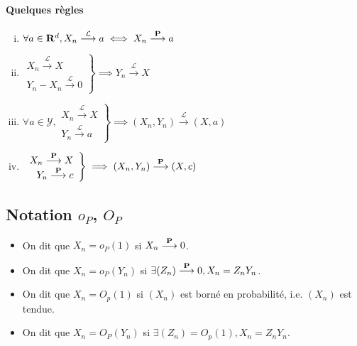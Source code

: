 \paragraph{Quelques règles}

	\begin{pop}
		\begin{enumerate}[(i)]
			\item $\forall a \in \mathbf{R}^d, X_n \overset{\mathcal{L}}{\longrightarrow} a \iff X_n \overset{\mathbf{P}}{\longrightarrow} a$
			\item $\left. \begin{array}{r}
				X_n \overset{\mathcal{L}}{\longrightarrow} X \\
				Y_n - X_n \overset{\mathcal{L}}{\longrightarrow} 0
				\end{array} \right\}
				\implies Y_n \overset{\mathcal{L}}{\longrightarrow} X$
			\item $\forall a \in \mathcal{Y}, \left. \begin{array}{r}
				X_n \overset{\mathcal{L}}{\longrightarrow} X \\
				Y_n \overset{\mathcal{L}}{\longrightarrow} a
				\end{array} \right\}
				\implies (X_n,Y_n) \overset{\mathcal{L}}{\longrightarrow} (X,a)$
			\item $\left. \begin{array}{r}
				X_n \overset{\mathbf{P}}{\longrightarrow} X \\
				Y_n \overset{\mathbf{P}}{\longrightarrow} c
				\end{array} \right\}
				\implies (X_n,Y_n) \overset{\mathbf{P}}{\longrightarrow} (X,c)$
		\end{enumerate}
	\end{pop}


\subsection{Notation $o_P$, $O_P$}

	
	\begin{note}
		\begin{itemize}
			\item[\textbullet] On dit que $X_n = o_P(1)$ si $X_n \overset{\mathbf{P}}{\longrightarrow} 0$.
			\item[\textbullet] On dit que $X_n = o_P(Y_n)$ si $\exists (Z_n) \overset{\mathbf{P}}{\longrightarrow} 0, X_n = Z_n Y_n$.
			\item[\textbullet] On dit que $X_n = O_p(1)$ si $(X_n)$ est borné en probabilité, i.e. $(X_n)$ est tendue.
			\item[\textbullet] On dit que $X_n = O_P(Y_n)$ si $\exists (Z_n) = O_p(1), X_n = Z_n Y_n$.
		\end{itemize}
	\end{note}

